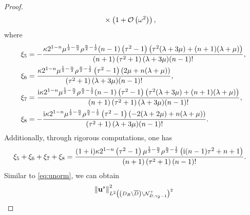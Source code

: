 \documentclass[11pt,reqno,twoside]{amsart}
\theoremstyle{definition}
\theoremstyle{remark}
\numberwithin{equation}{section}
\newcommand{\bu}{\mathbf{u}}
\newcommand{\bx}{\mathbf{x}}
\begin{document}
\begin{proof}
\begin{align}
		&\times \left(1+\mathcal{O}\left(\omega^2\right)\right),\notag
	\end{align}
	where
	\begin{align}
		\xi _5&=-\frac{\kappa 2^{1-n} \mu ^{\frac{1}{2}-\frac{n}{2}} \rho ^{\frac{n}{2}-\frac{1}{2}} (n-1) \left(\tau ^2-1\right)  \left(\tau ^2 (\lambda +3 \mu )+(n+1) (\lambda +\mu )\right)}{(n+1) \left(\tau ^2+1\right) (\lambda +3 \mu )  (n-1)!},\notag\\
		\xi _6&=\frac{\kappa 2^{1-n} \mu ^{\frac{1}{2}-\frac{n}{2}} \rho ^{\frac{n}{2}-\frac{1}{2}} \left(\tau ^2-1\right) (2 \mu +n (\lambda +\mu ))}{\left(\tau ^2+1\right) (\lambda +3 \mu )  (n-1)!},\notag\\
		\xi _7&=\frac{\mathrm{i} \kappa 2^{1-n}\mu ^{\frac{1}{2}-\frac{n}{2}} \rho ^{\frac{n}{2}-\frac{1}{2}} (n-1) \left(\tau ^2-1\right)  \left(\tau ^2 (\lambda +3 \mu )+(n+1) (\lambda +\mu )\right)}{(n+1) \left(\tau ^2+1\right) (\lambda +3 \mu ) (n-1)!},\notag\\
		\xi _8&=-\frac{\mathrm{i}  \kappa 2^{1-n}\mu ^{\frac{1}{2}-\frac{n}{2}} \rho ^{\frac{n}{2}-\frac{1}{2}} \left(\tau ^2-1\right)  (-2 (\lambda +2 \mu )+n (\lambda +\mu ))}{\left(\tau ^2+1\right) (\lambda +3 \mu ) (n-1)!}.\notag
	\end{align}
	Additionally, through rigorous computations, one has
	\begin{align}
		\xi _5&+\xi _6+\xi _7+\xi _8=\frac{(1+\mathrm{i} ) \kappa 2^{1-n} \left(\tau ^2-1\right) \mu ^{\frac{1}{2}-\frac{n}{2}} \rho ^{\frac{n}{2}-\frac{1}{2}} \left(\mathrm{i}  (n-1) \tau ^2+n+1\right)}{(n+1) \left(\tau ^2+1\right)(n-1)!}.\notag
	\end{align}
	Similar to \eqref{eq:unorm}, we can obtain
	\begin{align}
		&\left\|\bu^{s}\right\|_{L^{2}\left(\left(D_R \setminus \overline{D}\right) \setminus \mathcal{N}_{D,\gamma_{2}-1}^{+}\right)^{2}}^{2}\notag\\

\end{align}
\end{proof}
\end{document}
